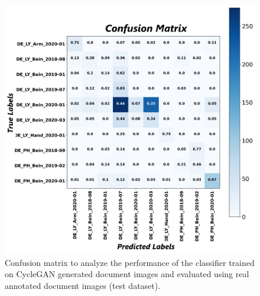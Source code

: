 \begin{figure}[H]
    \begin{center}
	\includegraphics[scale=0.25]{images/Appendix/Confusion_Matrix_CycleGAN_Generated_Data_Classifier_2021-06-02_21-55-39.png}
	\caption[Confusion matrix to analyze the performance of the classifier trained on \ac{CycleGAN} generated document images and evaluated using real annotated document images (test dataset).]{Confusion matrix to analyze the performance of the classifier trained on \ac{CycleGAN} generated document images and evaluated using real annotated document images (test dataset).}
	\label{fig:CMCycleganGeneratedDocumentImagesClassifier}
	\end{center}
\end{figure}


